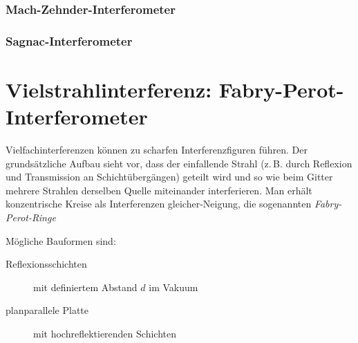 
\subsubsection{Mach-Zehnder-Interferometer}
\sFolien

\subsubsection{Sagnac-Interferometer}
\sFolien

\section[Vielstrahlinterferenzen]%
{Vielstrahlinterferenz: Fabry-Perot-Interferometer}
Vielfachinterferenzen können zu scharfen Interferenzfiguren führen.
Der grundsätzliche Aufbau sieht vor, dass der einfallende Strahl
(z.\,B. durch Reflexion und Transmission an Schichtübergängen)
geteilt wird und so wie beim Gitter mehrere Strahlen derselben Quelle
miteinander interferieren.
Man erhält konzentrische Kreise als Interferenzen gleicher-Neigung,
die sogenannten \emph{Fabry-Perot-Ringe}

Mögliche Bauformen sind:
\begin{description}
\item[Reflexionsschichten] mit definiertem Abstand $d$ im Vakuum
\item[planparallele Platte] mit hochreflektierenden Schichten
\end{description}

